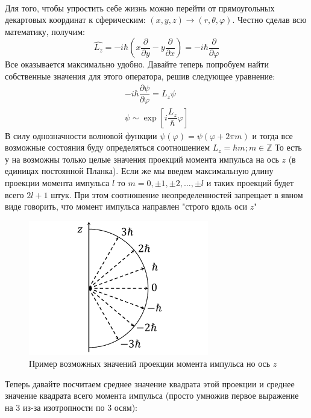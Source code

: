 \documentclass[12pt]{article}
\begin{document}
\\ Для того, чтобы упростить себе жизнь можно перейти от прямоугольных декартовых координат к сферическим: $(x,y,z) \rightarrow (r, \theta, \varphi)$. Честно сделав всю математику, получим:
\begin{equation}
    \hat{L_z} = -i\hbar\left(x\dfrac{\partial}{\partial y} - y\dfrac{\partial}{\partial x}\right)= -i\hbar\dfrac{\partial}{\partial \varphi}
\end{equation}
Все оказывается максимально удобно. Давайте теперь попробуем найти собственные значения для этого оператора, решив следующее уравнение:
\begin{gather*}
     -i\hbar\dfrac{\partial \psi}{\partial \varphi} = L_z \psi\\
     \psi \sim \exp{\left[i\dfrac{L_z}{\hbar} \varphi \right]}
\end{gather*}
В силу однозначности волновой функции $\psi(\varphi) = \psi(\varphi + 2\pi m)$ и тогда все возможные состояния буду определяться соотношением $L_z =\hbar m; m \in \mathbb{Z}$ То есть у на возможны только целые значения проекций момента импульса на ось $z$ (в единицах постоянной Планка). Если же мы введем максимальную длину проекции момента  импульса $l$ то $m = 0, \pm 1, \pm 2, \dots, \pm l$ и таких проекций будет всего $2l+1$ штук. При этом соотношение неопределенностей запрещает в явном виде говорить, что момент импульса направлен "строго вдоль оси $z$"
\begin{figure}[h]
    \centering
    \includegraphics[width=0.7\textwidth,height=\textheight,keepaspectratio]{Seminar_06/pics/pic_01.pdf}
    \caption{Пример возможных значений проекции момента импульса но ось $z$}
    \label{fig:sem_06_momet_projection}
\end{figure}
Теперь давайте посчитаем среднее значение квадрата этой проекции и среднее значение квадрата всего момента импульса (просто умножив первое выражение на 3 из-за изотропности по 3 осям):
\end{document}
